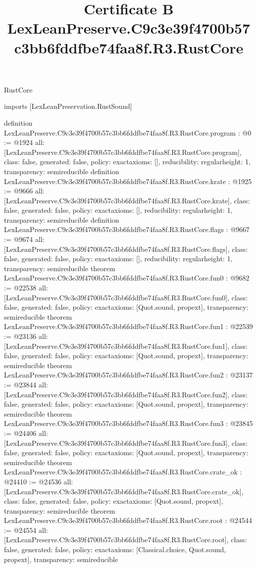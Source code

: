 \begin{lexlean}{RustCore}
\title{Certificate B LexLeanPreserve.C9c3e39f4700b57c3bb6fddfbe74faa8f.R3.RustCore}
\begin{coremodule}
imports [LexLeanPreservation.RustSound]

definition LexLeanPreserve.C9c3e39f4700b57c3bb6fddfbe74faa8f.R3.RustCore.program : @0 := @1924 {
  all: [LexLeanPreserve.C9c3e39f4700b57c3bb6fddfbe74faa8f.R3.RustCore.program],
  class: false,
  generated: false,
  policy: exact{axioms: []},
  reducibility: regular{height: 1},
  transparency: semireducible
}
definition LexLeanPreserve.C9c3e39f4700b57c3bb6fddfbe74faa8f.R3.RustCore.krate : @1925 := @9666 {
  all: [LexLeanPreserve.C9c3e39f4700b57c3bb6fddfbe74faa8f.R3.RustCore.krate],
  class: false,
  generated: false,
  policy: exact{axioms: []},
  reducibility: regular{height: 1},
  transparency: semireducible
}
definition LexLeanPreserve.C9c3e39f4700b57c3bb6fddfbe74faa8f.R3.RustCore.flags : @9667 := @9674 {
  all: [LexLeanPreserve.C9c3e39f4700b57c3bb6fddfbe74faa8f.R3.RustCore.flags],
  class: false,
  generated: false,
  policy: exact{axioms: []},
  reducibility: regular{height: 1},
  transparency: semireducible
}
theorem LexLeanPreserve.C9c3e39f4700b57c3bb6fddfbe74faa8f.R3.RustCore.fun0 : @9682 := @22538 {
  all: [LexLeanPreserve.C9c3e39f4700b57c3bb6fddfbe74faa8f.R3.RustCore.fun0],
  class: false,
  generated: false,
  policy: exact{axioms: [Quot.sound, propext]},
  transparency: semireducible
}
theorem LexLeanPreserve.C9c3e39f4700b57c3bb6fddfbe74faa8f.R3.RustCore.fun1 : @22539 := @23136 {
  all: [LexLeanPreserve.C9c3e39f4700b57c3bb6fddfbe74faa8f.R3.RustCore.fun1],
  class: false,
  generated: false,
  policy: exact{axioms: [Quot.sound, propext]},
  transparency: semireducible
}
theorem LexLeanPreserve.C9c3e39f4700b57c3bb6fddfbe74faa8f.R3.RustCore.fun2 : @23137 := @23844 {
  all: [LexLeanPreserve.C9c3e39f4700b57c3bb6fddfbe74faa8f.R3.RustCore.fun2],
  class: false,
  generated: false,
  policy: exact{axioms: [Quot.sound, propext]},
  transparency: semireducible
}
theorem LexLeanPreserve.C9c3e39f4700b57c3bb6fddfbe74faa8f.R3.RustCore.fun3 : @23845 := @24406 {
  all: [LexLeanPreserve.C9c3e39f4700b57c3bb6fddfbe74faa8f.R3.RustCore.fun3],
  class: false,
  generated: false,
  policy: exact{axioms: [Quot.sound, propext]},
  transparency: semireducible
}
theorem LexLeanPreserve.C9c3e39f4700b57c3bb6fddfbe74faa8f.R3.RustCore.crate_ok : @24410 := @24536 {
  all: [LexLeanPreserve.C9c3e39f4700b57c3bb6fddfbe74faa8f.R3.RustCore.crate_ok],
  class: false,
  generated: false,
  policy: exact{axioms: [Quot.sound, propext]},
  transparency: semireducible
}
theorem LexLeanPreserve.C9c3e39f4700b57c3bb6fddfbe74faa8f.R3.RustCore.root : @24544 := @24554 {
  all: [LexLeanPreserve.C9c3e39f4700b57c3bb6fddfbe74faa8f.R3.RustCore.root],
  class: false,
  generated: false,
  policy: exact{axioms: [Classical.choice, Quot.sound, propext]},
  transparency: semireducible
}


\end{coremodule}
\end{lexlean}
